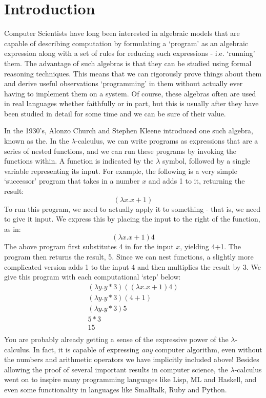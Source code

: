 \chapter{Introduction}
	Computer Scientists have long been interested in algebraic models that are capable of describing computation by formulating a `program' as an algebraic expression along with a set of rules for reducing such expressions - i.e. `running' them.  
The advantage of such algebras is that they can be studied using formal reasoning techniques.  
This means that we can rigorously prove things about them and derive useful observations `programming' in them without actually ever having to implement them on a system.  
Of course, these algebras often are used in real languages whether faithfully or in part, but this is usually after they have been studied in detail for some time and we can be sure of their value.
	
	In the 1930's, Alonzo Church and Stephen Kleene introduced one such algebra, known as the.  
In the $\lambda$-calculus, we can write programs as expressions that are a series of nested functions, and we can run these programs by invoking the functions within.  
A function is indicated by the $\lambda$ symbol, followed by a single variable representing its input.  
For example, the following is a very simple `successor' program that takes in a number $x$ and adds 1 to it, returning the result:
	\[
		(\lambda x. x + 1)
	\]
To run this program, we need to actually apply it to something - that is, we need to give it input.  
We express this by placing the input to the right of the function, as in:
\[
	(\lambda x. x + 1) 4
\]
The above program first substitutes 4 in for the input $x$, yielding 4+1.  
The program then returns the result, 5.  
Since we can nest functions, a slightly more complicated version adds 1 to the input 4 and then multiplies the result by 3.  
We give this program with each computational `step' below:
\begin{align*}
	(\lambda y. y * 3) ((\lambda x. x + 1) 4)\\
	(\lambda y. y * 3) (4+1)\\
	(\lambda y. y * 3) 5\\
	5 * 3\\
	15\\
\end{align*}
You are probably already getting a sense of the expressive power of the $\lambda$-calculus.  
In fact, it is capable of expressing \emph{any} computer algorithm, even without the numbers and arithmetic operators we have implicitly included above!  Besides allowing the proof of several important results in computer science, the $\lambda$-calculus went on to inspire many programming languages like Lisp, ML and Haskell, and even some functionality in languages like Smalltalk, Ruby and Python.

